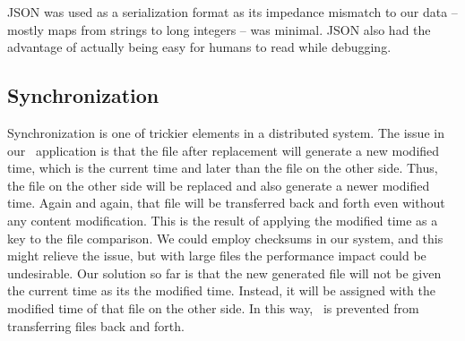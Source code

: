 JSON was used as a serialization format as its impedance mismatch to our data – mostly maps from strings to long integers – was minimal. JSON also had the advantage of actually being easy for humans to read while debugging.

\subsection{Synchronization}
Synchronization is one of trickier elements in a distributed system. The issue in our \teledroid\ application is that the file after replacement will generate a new modified time, which is the current time and later than the file on the other side. Thus, the file on the other side will be replaced and also generate a newer modified time. Again and again, that file will be transferred back and forth even without any content modification. This is the result of applying the modified time as a key to the file comparison. We could employ checksums in our system, and this might relieve the issue, but with large files the performance impact could be undesirable. Our solution so far is that the new generated file will not be given the current time as its the modified time. Instead, it will be assigned with the modified time of that file on the other side. In this way, \teledroid\ is prevented from transferring files back and forth.



